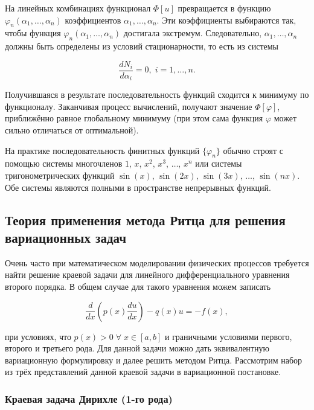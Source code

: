 \documentclass{article}
\begin{document}
На линейных комбинациях функционал $\Phi[u]$ превращается в функцию $\varphi_{n}(\alpha_{1}, \ldots, \alpha_{n})$ коэффициентов $\alpha_{1}, \ldots, \alpha_{n}$. Эти коэффициенты выбираются так, чтобы функция $\varphi_{n}(\alpha_{1}, \ldots, \alpha_{n})$ достигала экстремум. Следовательно, $\alpha_{1}, \ldots, \alpha_{n}$ должны быть определены из условий стационарности, то есть из системы

\begin{displaymath}
	\frac{d N_{i}}{d\alpha_{i}} = 0, \; i = 1, \ldots, n.
\end{displaymath}

Получившаяся в результате последовательность функций сходится к минимуму по функционалу. Заканчивая процесс вычислений, получают значение $\Phi[\varphi]$, приближённо равное глобальному минимуму (при этом сама функция $\varphi$ может сильно отличаться от оптимальной).

На практике последовательность финитных функций ${\lbrace \varphi_{n} \rbrace}$ обычно строят с помощью системы многочленов $1$, $x$, $x^2$, $x^3$, $\ldots$, $x^n$ или системы тригонометрических функций $\sin (x)$, $\sin (2x)$, $\sin (3x)$, $\ldots$, $\sin (nx)$. Обе системы являются полными в пространстве непрерывных функций.

\subsection{Теория применения метода Ритца для решения вариационных задач}

Очень часто при математическом моделировании физических процессов требуется найти решение краевой задачи для линейного дифференциального уравнения второго порядка. В общем случае для такого уравнения можем записать

\begin{equation}\label{ODE_rank_2}
	\frac{d }{dx} \left( p(x) \frac{du}{dx} \right) - q(x)u = -f(x),
\end{equation}

\noindent при условиях, что $p(x) > 0 \; \forall \; x \in \left[ a, b \right]$ и граничными условиями первого, второго и третьего рода. Для данной задачи можно дать эквивалентную вариационную формулировку и далее решить методом Ритца.
Рассмотрим набор из трёх представлений данной краевой задачи в вариационной постановке.

\subsubsection{Краевая задача Дирихле (1-го рода)}
\end{document}
